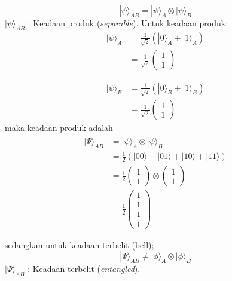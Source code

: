 \begin{equation}
    |\psi\rangle_{AB} = |\psi\rangle_A \otimes |\psi\rangle_B
\end{equation}
$|\psi\rangle_{AB}$ : Keadaan produk (\textit{separable}).
Untuk keadaan produk;
\begin{equation}
    \begin{split}
    |\psi \rangle _A &= \frac{1}{\sqrt{2}} (|0\rangle_A + |1\rangle_A) \\
    &= \frac{1}{\sqrt{2}} \begin{pmatrix} 1 \\ 1 \end{pmatrix}
    \end{split}
\end{equation}

\begin{equation}
    \begin{split}
    |\psi \rangle _B &= \frac{1}{\sqrt{2}} (|0\rangle_B + |1\rangle_B) \\
    &= \frac{1}{\sqrt{2}} \begin{pmatrix} 1 \\ 1 \end{pmatrix}
    \end{split}
\end{equation}
maka keadaan produk adalah
\begin{equation}
    \begin{split}
    |\Psi\rangle_{AB} &= |\psi\rangle_A \otimes |\psi\rangle_B \\
    &= \frac{1}{2} (|00\rangle + |01\rangle + |10\rangle + |11\rangle) \\
    &= \frac{1}{2} \begin{pmatrix} 1 \\ 1 \end{pmatrix} \otimes \begin{pmatrix} 1 \\ 1 \end{pmatrix} \\
    &= \frac{1}{2} \begin{pmatrix} 1 \\ 1 \\ 1 \\ 1 \end{pmatrix}
    \end{split}
\end{equation}

sedangkan untuk keadaan terbelit (bell);
\begin{equation}
    |\Psi\rangle_{AB} \ne |\phi\rangle_A \otimes |\phi\rangle_B
\end{equation}
$|\Psi\rangle_{AB}$ : Keadaan terbelit (\textit{entangled}).


